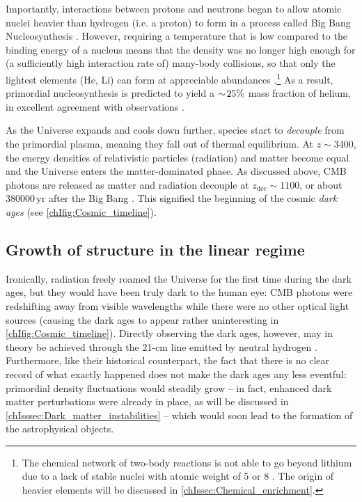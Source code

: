 Importantly, interactions between protons and neutrons began to allow atomic nuclei heavier than hydrogen (i.e. a proton) to form in a process called Big Bang Nucleosynthesis \citep[BBN; work on this was pioneered by][]{1949RvMP...21..367G}. However, requiring a temperature that is low compared to the binding energy of a nucleus means that the density was no longer high enough for (a sufficiently high interaction rate of) many-body collisions, so that only the lightest elements (He, Li) can form at appreciable abundances \citep{1967ApJ...148....3W}.\footnote{The chemical network of two-body reactions is not able to go beyond lithium due to a lack of stable nuclei with atomic weight of 5 or 8 \citep[e.g.][]{2010gfe..book.....M}. The origin of heavier elements will be discussed in \cref{chIssec:Chemical_enrichment}.} As a result, primordial nucleosynthesis is predicted to yield a $\sim \! 25\%$ mass fraction of helium, in excellent agreement with observations \citep[and hence considered a key validation of the Big Bang theory;][]{2016RvMP...88a5004C}.

As the Universe expands and cools down further, species start to \textit{decouple} from the primordial plasma, meaning they fall out of thermal equilibrium. At $z \sim 3400$, the energy densities of relativistic particles (radiation) and matter become equal and the Universe enters the matter-dominated phase. As discussed above, CMB photons are released as matter and radiation decouple at $z_\text{dec} \sim 1100$, or about $\num{380000} \, \mathrm{yr}$ after the Big Bang \citep{2010gfe..book.....M}. This signified the beginning of the cosmic \textit{dark ages} (see \cref{chIfig:Cosmic_timeline}).

\subsection{Growth of structure in the linear regime}
\label{chIssec:Growt_of_structure_in_the_linear_regime}

Ironically, radiation freely roamed the Universe for the first time during the dark ages, but they would have been truly dark to the human eye: CMB photons were redshifting away from visible wavelengths while there were no other optical light sources (causing the dark ages to appear rather uninteresting in \cref{chIfig:Cosmic_timeline}). Directly observing the dark ages, however, may in theory be achieved through the 21-cm line emitted by neutral hydrogen \citep[e.g.][]{2006PhR...433..181F}. Furthermore, like their historical counterpart, the fact that there is no clear record of what exactly happened does not make the dark ages any less eventful: primordial density fluctuations would steadily grow -- in fact, enhanced dark matter perturbations were already in place, as will be discussed in \cref{chIsssec:Dark_matter_instabilities} -- which would soon lead to the formation of the astrophysical objects.


